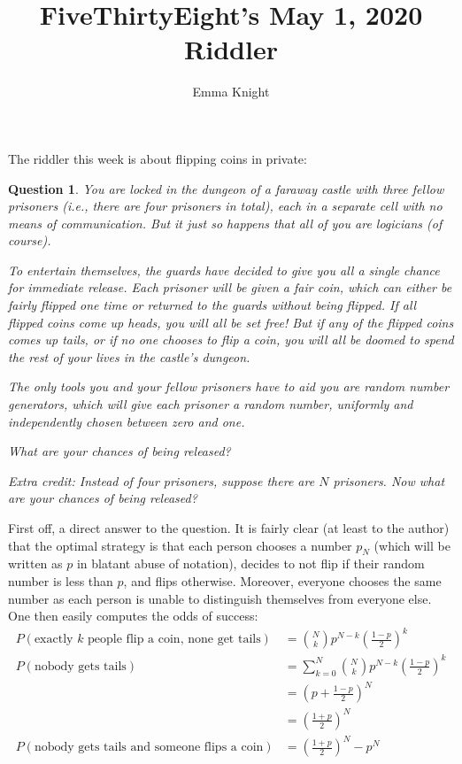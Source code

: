 \documentclass[11pt]{article}
\title{FiveThirtyEight's May 1, 2020 Riddler}
\author{Emma Knight}
\newtheorem{question}[theorem]{Question}
\theoremstyle{definition}
\begin{document}
\maketitle
The riddler this week is about flipping coins in private:
\begin{question}
You are locked in the dungeon of a faraway castle with three fellow prisoners (i.e., there are four prisoners in total), each in a separate cell with no means of communication. But it just so happens that all of you are logicians (of course).

To entertain themselves, the guards have decided to give you all a single chance for immediate release. Each prisoner will be given a fair coin, which can either be fairly flipped one time or returned to the guards without being flipped. If all flipped coins come up heads, you will all be set free! But if any of the flipped coins comes up tails, or if no one chooses to flip a coin, you will all be doomed to spend the rest of your lives in the castle’s dungeon.

The only tools you and your fellow prisoners have to aid you are random number generators, which will give each prisoner a random number, uniformly and independently chosen between zero and one.

What are your chances of being released?

Extra credit: Instead of four prisoners, suppose there are $N$ prisoners. Now what are your chances of being released?
\end{question}
First off, a direct answer to the question.  It is fairly clear (at least to the author) that the optimal strategy is that each person chooses a number $p_N$ (which will be written as $p$ in blatant abuse of notation), decides to not flip if their random number is less than $p$, and flips otherwise.  Moreover, everyone chooses the same number as each person is unable to distinguish themselves from everyone else.  One then easily computes the odds of success:
\begin{align*}
P(\text{exactly }k\text{ people flip a coin, none get tails}) & = \binom{N}{k} p^{N-k}\left(\frac{1-p}{2}\right)^{k} \\
P(\text{nobody gets tails}) & = \sum_{k = 0}^{N} \binom{N}{k} p^{N-k}\left(\frac{1-p}{2}\right)^{k} \\
& = \left(p + \frac{1-p}{2}\right)^N \\
& = \left(\frac{1+p}{2}\right)^N \\
P(\text{nobody gets tails and someone flips a coin}) & = \left(\frac{1+p}{2}\right)^N - p^N
\end{align*}
\end{document}
